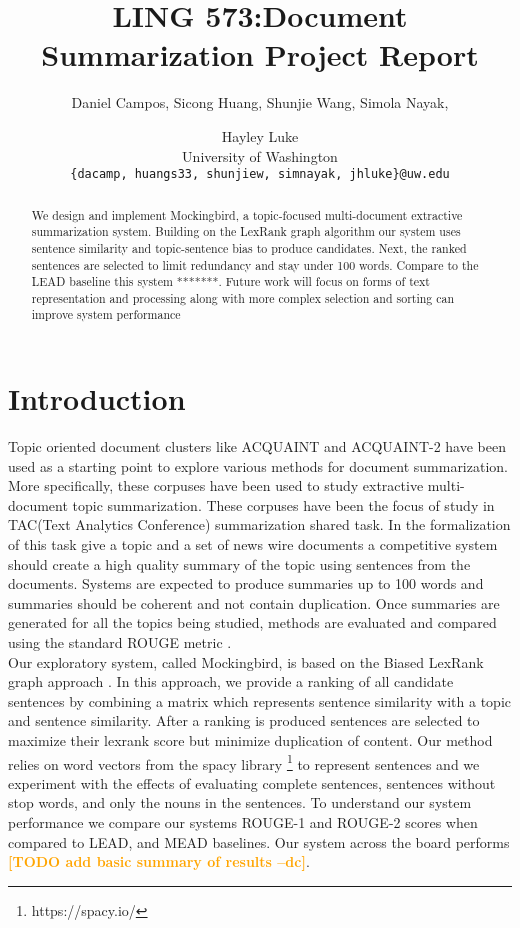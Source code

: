 \documentclass[11pt,a4paper]{article}
\title{LING 573:Document Summarization Project Report}
\author{Daniel Campos, Sicong Huang, Shunjie Wang, Simola Nayak, \and Hayley Luke \\ University of Washington \\ {\tt\{dacamp, huangs33, shunjiew, simnayak, jhluke\}@uw.edu}}
\newcommand{\spacemanidol}[1]{\textcolor{orange}{\bf \small [#1 --dc]}}
\begin{document}
\maketitle
\begin{abstract}
We design and implement Mockingbird, a topic-focused multi-document extractive summarization system. Building on the LexRank graph algorithm our system uses sentence similarity and topic-sentence bias to produce candidates. Next, the ranked sentences are  selected to limit redundancy and stay under 100 words. Compare to the LEAD baseline this system *******. Future work will focus on forms of text representation and processing along with more complex selection and sorting can improve system performance
\end{abstract}
\section{Introduction}
Topic oriented document clusters like ACQUAINT \cite{Graff2002TheAC} and ACQUAINT-2 have been used as a starting point to explore various methods for document summarization. More specifically, these corpuses have been used to study extractive multi-document topic summarization. These corpuses have been the focus of study in TAC(Text Analytics Conference) \cite{} summarization shared task. In the formalization of this task give a topic and a set of news wire documents a competitive system should create a high quality summary of the topic using sentences from the documents. Systems are expected to produce summaries up to 100 words and summaries should be coherent and not contain duplication. Once summaries are generated for all the topics being studied, methods are evaluated and compared using the standard ROUGE metric \cite{}.  \\ Our exploratory system, called Mockingbird, is based on the Biased LexRank graph approach \cite{Otterbacher2009BiasedLP}. In this approach, we provide a ranking of all candidate sentences by combining a matrix which represents sentence similarity with a topic and sentence similarity. After a ranking is produced sentences are selected to maximize their lexrank score but minimize duplication of content. Our method relies on word vectors \cite{Mikolov2013DistributedRO} from the spacy library \footnote{https://spacy.io/} to represent sentences and we experiment with the effects of evaluating complete sentences, sentences without stop words, and only the nouns in the sentences. To understand our system performance we compare our systems ROUGE-1 and ROUGE-2 scores when compared to LEAD, and MEAD baselines. Our system across the board performs \spacemanidol{TODO add basic summary of results}. 
\end{document}
